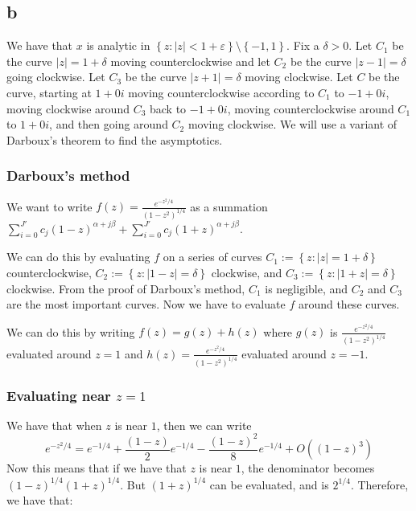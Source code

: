 \documentclass[]{article}
\begin{document}
\subsection{b}
We have that $x$ is analytic in $\left\{ z: |z| < 1 + \varepsilon \right\} \setminus \left\{ -1, 1 \right\}$. Fix a $\delta > 0$. Let $C_1$ be the curve $|z| = 1 + \delta$ moving counterclockwise  and let $C_2$ be the curve $|z - 1| = \delta$ going clockwise. Let $C_3$ be the curve $|z + 1| = \delta$ moving clockwise. Let $C$ be the curve, starting at $1 + 0i$ moving counterclockwise according to $C_1$ to $-1 + 0i$, moving clockwise around $C_3$ back to $-1 + 0 i$, moving counterclockwise around $C_1$ to $1 + 0i$, and then going around $C_2$ moving clockwise. We will use a variant of Darboux's theorem to find the asymptotics.


\subsubsection{Darboux's method}

We want to write $f(z) =\frac{e^{-z^2/4}}{(1 - z^2)^{1/4}}$ as a summation $\sum_{i = 0}^{J'} c_j (1 - z)^{\alpha + j \beta} + \sum_{i = 0}^{J'} c_j (1 + z)^{\alpha + j \beta}$.

We can do this by evaluating $f$ on a series of curves $C_1 := \left\{z : |z| = 1 + \delta\right\}$ counterclockwise, $C_2 := \left\{z : |1 - z| = \delta\right\}$ clockwise, and $C_3 := \left\{z : |1 + z| = \delta\right\}$ clockwise. From the proof of Darboux's method, $C_1$ is negligible, and $C_2$ and $C_3$ are the most important curves. Now we have to evaluate $f$ around these curves. 


We can do this by writing $f(z) = g(z) + h(z)$ where $g(z)$ is $\frac{e^{-z^2/4}}{(1 - z^2)^{1/4}}$ evaluated around $z = 1$ and $h(z) = \frac{e^{-z^2/4}}{(1 - z^2)^{1/4}}$ evaluated around $z = -1$.

\subsubsection{Evaluating near $z = 1$}
 We have that when $z$ is near $1$, then we can write
\begin{equation}
	e^{-z^2/4} = e^{-1/4} + \frac{(1-z)}{2} e^{-1/4}  - \frac{(1 - z)^2}{8} e^{-1/4} + O((1 - z)^3)
\end{equation}
Now this means that if we have that $z$ is near $1$, the denominator becomes $(1 - z)^{1/4} (1 + z)^{1/4}$. But $(1 + z)^{1/4}$ can be evaluated, and is $2^{1/4}$. Therefore, we have that:
\end{document}
